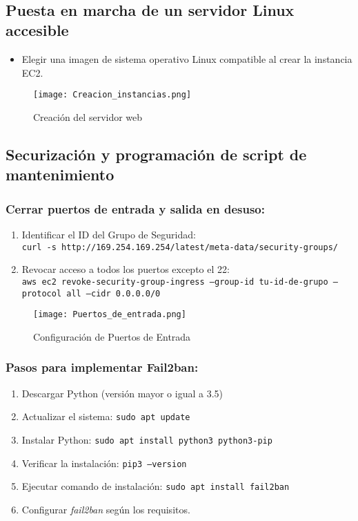 \documentclass{article}
\begin{document}
\

\subsection{Puesta en marcha de un servidor Linux accesible}
\begin{itemize}
  \item Elegir una imagen de sistema operativo Linux compatible al crear la instancia EC2.
\end{itemize}

\begin{figure}[ht]
    \centering
    \texttt{[image: Creacion\_instancias.png]}
    \caption{Creación del servidor web}
  \end{figure}

\newpage

\subsection{Securización y programación de script de mantenimiento}

\subsubsection{Cerrar puertos de entrada y salida en desuso:}
\begin{enumerate}
    \item Identificar el ID del Grupo de Seguridad: \\
    \texttt{curl -s http://169.254.169.254/latest/meta-data/security-groups/}
    \item Revocar acceso a todos los puertos excepto el 22: \\
    \texttt{aws ec2 revoke-security-group-ingress --group-id tu-id-de-grupo --protocol all --cidr 0.0.0.0/0}
\end{enumerate}

\begin{figure}[ht]
    \centering
    \texttt{[image: Puertos\_de\_entrada.png]}
    \caption{Configuración de Puertos de Entrada}
  \end{figure}

\subsubsection{Pasos para implementar Fail2ban:}
\begin{enumerate}
  \item Descargar Python (versión mayor o igual a 3.5)
  \item Actualizar el sistema: \texttt{sudo apt update}
  \item Instalar Python: \texttt{sudo apt install python3 python3-pip}
  \item Verificar la instalación: \texttt{pip3 --version}
  \item Ejecutar comando de instalación: \texttt{sudo apt install fail2ban}
  \item Configurar \textit{fail2ban} según los requisitos.
\end{enumerate}
\end{document}

